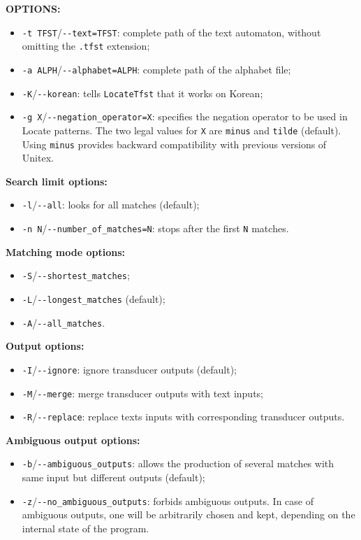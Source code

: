 \bigskip
\noindent \textbf{OPTIONS:}
\begin{itemize}
  \item \verb+-t TFST+/\verb+--text=TFST+: complete path of the text automaton,
  without omitting the \verb+.tfst+ extension;

  \item \verb+-a ALPH+/\verb+--alphabet=ALPH+: complete path of the alphabet
  file;
  
  \item \verb+-K+/\verb+--korean+: tells \verb+LocateTfst+ that it works on
  Korean;

  \item \verb+-g X+/\verb+--negation_operator=X+: specifies the negation operator to be used in
  Locate patterns. The two legal values for \verb+X+ are \verb+minus+ and \verb+tilde+ (default).
  Using \verb+minus+ provides backward compatibility with previous versions of Unitex.
  
\end{itemize}

\bigskip
\noindent \textbf{Search limit options:}
\begin{itemize}
  \item \verb+-l+/\verb+--all+: looks for all matches (default);
  \item \verb+-n N+/\verb+--number_of_matches=N+: stops after the first
  \verb+N+ matches.
\end{itemize}

\bigskip
\noindent \textbf{Matching mode options:}
\begin{itemize}
  \item \verb+-S+/\verb+--shortest_matches+;
  \item \verb+-L+/\verb+--longest_matches+ (default);
  \item \verb+-A+/\verb+--all_matches+.
\end{itemize}

\bigskip
\noindent \textbf{Output options:}
\begin{itemize}
  \item \verb+-I+/\verb+--ignore+: ignore transducer outputs (default);
  \item \verb+-M+/\verb+--merge+: merge transducer outputs with text inputs;
  \item \verb+-R+/\verb+--replace+: replace texts inputs with corresponding
  transducer outputs.
\end{itemize}

\bigskip
\noindent \textbf{Ambiguous output options:}
\begin{itemize}
  \item \verb+-b+/\verb+--ambiguous_outputs+: allows the production of several 
  matches with same input but different outputs (default);
  \item \verb+-z+/\verb+--no_ambiguous_outputs+: forbids ambiguous outputs. In
  case of ambiguous outputs, one will be arbitrarily chosen and kept, depending on the
  internal state of the program.
\end{itemize}

